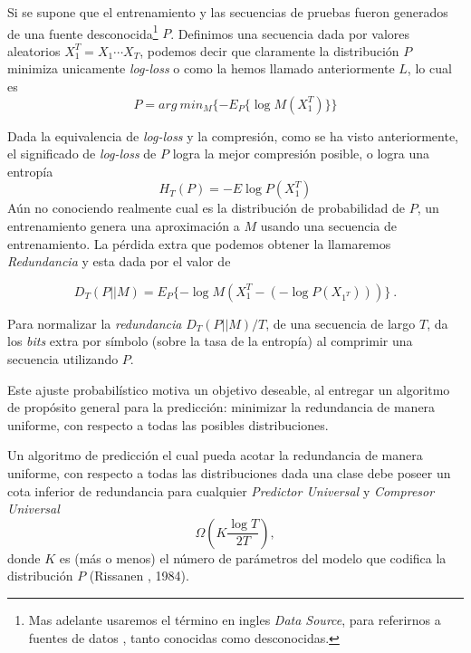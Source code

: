 Si se supone que el entrenamiento y las secuencias de pruebas fueron generados de una fuente desconocida\footnote{Mas adelante usaremos el término en ingles \emph{Data Source}, para referirnos a fuentes de datos , tanto conocidas como desconocidas.} $P$. Definimos una secuencia dada por valores aleatorios $X_{1}^{T} = X_{1} \cdots X_{T} $, podemos decir que claramente la distribución $P$ minimiza unicamente \emph{log-loss} o como la hemos llamado anteriormente $L$, lo cual es \begin{equation}
P = arg\ min_{M} \{ - E_{P} \{\log M( X_{1}^{T} )\}   \}
\end{equation}


Dada la equivalencia de \emph{log-loss} y la compresión, como se ha visto anteriormente, el significado de \emph{log-loss} de $P$ logra la mejor compresión posible, o logra una entropía 
\begin{equation}
	H_{T}(P) = - E \log P( X_{1}^{T} ) 
\end{equation}
Aún no conociendo realmente cual es la distribución de probabilidad de $P$, un entrenamiento genera una aproximación a $M$ usando una secuencia de entrenamiento. La pérdida extra que podemos obtener la llamaremos \emph{Redundancia} y esta dada por el valor de

\begin{equation}
D_{T} ( P || M ) = E_{P} \{ - \log M(X_{1}^{T} - (- \log P(X_{1^{T}})   )  )       \} \ .
\end{equation}
 

Para normalizar la \emph{redundancia} $D_{T} ( P || M ) / T $, de una secuencia de largo $T$, da los  \emph{bits} extra por símbolo (sobre la tasa de la entropía) al comprimir una secuencia utilizando $P$.  

Este ajuste probabilístico motiva un objetivo deseable, al entregar un algoritmo de propósito general para la predicción: minimizar la redundancia de manera uniforme, con respecto a todas las posibles distribuciones. 

Un algoritmo de predicción el cual pueda acotar la redundancia de manera uniforme, con respecto a todas las distribuciones dada una clase debe poseer un cota inferior de redundancia para cualquier \emph{Predictor Universal} y \emph{Compresor Universal} \begin{equation}
\Omega \left(  K \dfrac{\log T}{2 T } \right),
\end{equation} donde $K$ es (más o menos) el número de parámetros del modelo que codifica la distribución $P$ (Rissanen \cite{Rissanen1984}, 1984).







